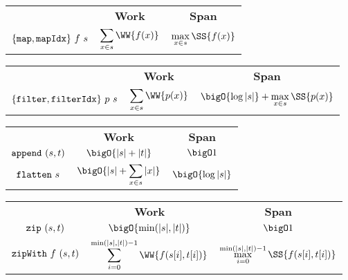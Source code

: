 

\begin{costspec}[Map]
\begin{tabular}{c|c|c}
& \textbf{Work} & \textbf{Span} \\
%
$\{\texttt{map},\texttt{mapIdx}\}~f~s$ &
$\displaystyle \sum_{x \in s} \WW{f(x)}$ &
$\displaystyle \max_{x \in s} \SS{f(x)}$ \\
%
\end{tabular}
\end{costspec}

\begin{costspec}[Filter]
\begin{tabular}{c|c|c}
& \textbf{Work} & \textbf{Span} \\
%
$\{\texttt{filter},\texttt{filterIdx}\}~p~s$ &
$\displaystyle \sum_{x \in s} \WW{p(x)}$ &
$\displaystyle \bigO{\log{|s|}} + \max_{x \in s} \SS{p(x)}$ \\
%
\end{tabular}
\end{costspec}

\begin{costspec}[Concatenation]
\begin{tabular}{c|c|c}
& \textbf{Work} & \textbf{Span} \\
%
$\texttt{append}~(s,t)$ &
$\displaystyle \bigO{|s| + |t|}$ &
$\displaystyle \bigO 1$ \\
%
$\texttt{flatten}~s$ &
$\displaystyle \bigO{|s| + \sum_{x \in s} |x|}$ &
$\displaystyle \bigO{\log{|s|}}$
%
\end{tabular}
\end{costspec}

\begin{costspec}[Zip]
\begin{tabular}{c|c|c}
& \textbf{Work} & \textbf{Span} \\
%
$\texttt{zip}~(s,t)$ &
$\displaystyle \bigO{\min(|s|,|t|)}$ &
$\displaystyle \bigO 1$ \\
%
$\texttt{zipWith}~f~(s,t)$ &
$\displaystyle \sum_{i = 0}^{\min(|s|,|t|)-1} \WW{f(s[i],t[i])}$ &
$\displaystyle \max_{i = 0}^{\min(|s|,|t|)-1} \SS{f(s[i],t[i])}$
%
\end{tabular}
\end{costspec}

